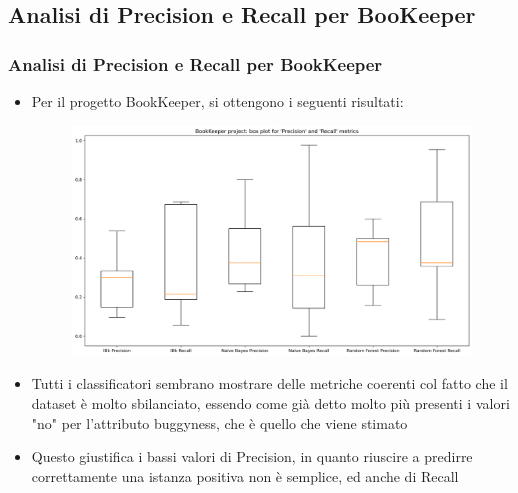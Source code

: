 \documentclass[10pt]{beamer}
\begin{document}
\begin{frame}
\section{Analisi di Precision e Recall per BooKeeper}
\frametitle{Analisi di Precision e Recall per BookKeeper}
\begin{itemize}
\item Per il progetto BookKeeper, si ottengono i seguenti risultati:
\begin{figure}
\includegraphics[scale=0.25]{images/pc_rc_base_bk}
\end{figure}
\item Tutti i classificatori sembrano mostrare delle metriche coerenti col fatto che il dataset è molto sbilanciato, essendo come già detto molto più presenti i valori "no" per l'attributo buggyness, che è quello che viene stimato
\item Questo giustifica i bassi valori di Precision, in quanto riuscire a predirre correttamente una istanza positiva non è semplice, ed anche di Recall
\end{itemize}
\end{frame}
\end{document}
